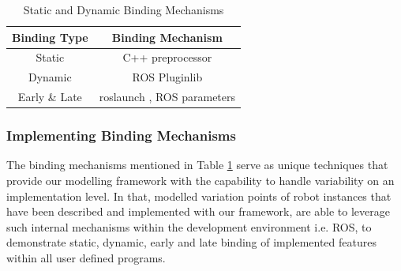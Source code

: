 \documentclass[conference]{IEEEtran}
\begin{document}
\begin{table}[H]
	\caption{Static and Dynamic Binding Mechanisms}
	\begin{center}
		\begin{tabular}{c c}
			\hline
			Binding Type & Binding Mechanism \\ \hline
			Static & C++ preprocessor \\ \hline
			Dynamic &  ROS Pluginlib  \\ \hline
			Early \& Late &  roslaunch , ROS parameters  \\ \hline
			
		\end{tabular}
		\label{tab:realmecha}
	\end{center}
\end{table}

\subsubsection{Implementing Binding Mechanisms}
The binding mechanisms mentioned in Table \ref{tab:realmecha} serve as unique techniques that provide our modelling framework with the capability to handle variability on an implementation level. In that, modelled variation points of robot instances that have been described and implemented with our framework, are able to leverage such internal mechanisms within the development environment i.e. ROS, to demonstrate static, dynamic, early and late binding of implemented features within all user defined programs.
\end{document}
